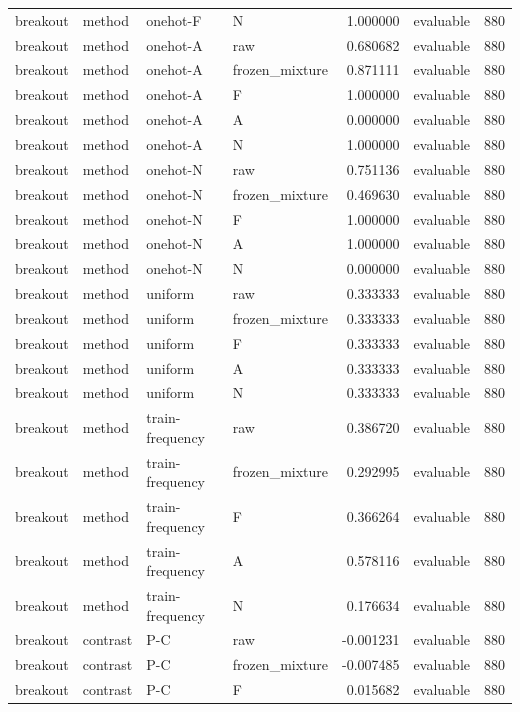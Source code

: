\begin{longtable}{llllrlr}
breakout & method & onehot-F & N & 1.000000 & evaluable & 880 \\
breakout & method & onehot-A & raw & 0.680682 & evaluable & 880 \\
breakout & method & onehot-A & frozen\_mixture & 0.871111 & evaluable & 880 \\
breakout & method & onehot-A & F & 1.000000 & evaluable & 880 \\
breakout & method & onehot-A & A & 0.000000 & evaluable & 880 \\
breakout & method & onehot-A & N & 1.000000 & evaluable & 880 \\
breakout & method & onehot-N & raw & 0.751136 & evaluable & 880 \\
breakout & method & onehot-N & frozen\_mixture & 0.469630 & evaluable & 880 \\
breakout & method & onehot-N & F & 1.000000 & evaluable & 880 \\
breakout & method & onehot-N & A & 1.000000 & evaluable & 880 \\
breakout & method & onehot-N & N & 0.000000 & evaluable & 880 \\
breakout & method & uniform & raw & 0.333333 & evaluable & 880 \\
breakout & method & uniform & frozen\_mixture & 0.333333 & evaluable & 880 \\
breakout & method & uniform & F & 0.333333 & evaluable & 880 \\
breakout & method & uniform & A & 0.333333 & evaluable & 880 \\
breakout & method & uniform & N & 0.333333 & evaluable & 880 \\
breakout & method & train-frequency & raw & 0.386720 & evaluable & 880 \\
breakout & method & train-frequency & frozen\_mixture & 0.292995 & evaluable & 880 \\
breakout & method & train-frequency & F & 0.366264 & evaluable & 880 \\
breakout & method & train-frequency & A & 0.578116 & evaluable & 880 \\
breakout & method & train-frequency & N & 0.176634 & evaluable & 880 \\
breakout & contrast & P-C & raw & -0.001231 & evaluable & 880 \\
breakout & contrast & P-C & frozen\_mixture & -0.007485 & evaluable & 880 \\
breakout & contrast & P-C & F & 0.015682 & evaluable & 880 \\

\end{longtable}
